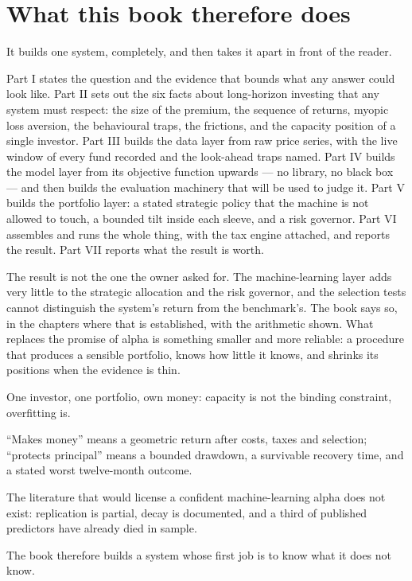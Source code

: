 \section{What this book therefore does}

It builds one system, completely, and then takes it apart in front of the
reader.

Part I states the question and the evidence that bounds what any answer
could look like. Part II sets out the six facts about long-horizon investing
that any system must respect: the size of the premium, the sequence of
returns, myopic loss aversion, the behavioural traps, the frictions, and
the capacity position of a single investor. Part III builds the data layer
from raw price series, with the live window of every fund recorded and the
look-ahead traps named. Part IV builds the model layer from its objective
function upwards --- no library, no black box --- and then builds the
evaluation machinery that will be used to judge it. Part V builds the
portfolio layer: a stated strategic policy that the machine is not allowed
to touch, a bounded tilt inside each sleeve, and a risk governor. Part VI
assembles and runs the whole thing, with the tax engine attached, and reports
the result. Part VII reports what the result is worth.

The result is not the one the owner asked for. The machine-learning layer
adds very little to the strategic allocation and the risk governor, and the
selection tests cannot distinguish the system's return from the benchmark's.
The book says so, in the chapters where that is established, with the
arithmetic shown. What replaces the promise of alpha is something smaller
and more reliable: a procedure that produces a sensible portfolio, knows how
little it knows, and shrinks its positions when the evidence is thin.

\begin{keytakeaways}
\item One investor, one portfolio, own money: capacity is not the binding
constraint, overfitting is.
\item ``Makes money'' means a geometric return after costs, taxes and
selection; ``protects principal'' means a bounded drawdown, a survivable
recovery time, and a stated worst twelve-month outcome.
\item The literature that would license a confident machine-learning alpha
does not exist: replication is partial, decay is documented, and a third of
published predictors have already died in sample.
\item The book therefore builds a system whose first job is to know what it
does not know.
\end{keytakeaways}
